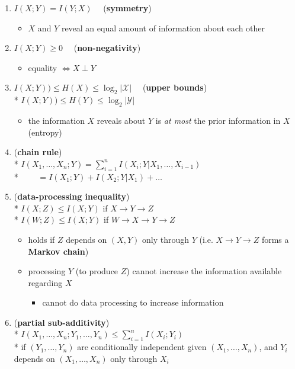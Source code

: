 \documentclass[10pt, landscape]{article}
\begin{document}
\begin{multicols*}{4}
  \begin{enumerate}
    \item $I(X; Y) = I(Y;X) \quad$ (\textbf{symmetry})
      \begin{itemize}
        \item $X$ and $Y$ reveal an equal amount of information about each other
      \end{itemize}
    \item $I(X;Y) \geq 0 \quad $ (\textbf{non-negativity})
      \begin{itemize}
        \item equality $\iff X \perp Y$
      \end{itemize}
    \item $I(X;Y)) \leq H(X) \leq \log_2 \vert \mathcal{X} \vert \quad$ (\textbf{upper bounds}) 
      \\* $I(X;Y)) \leq H(Y) \leq \log_2 \vert \mathcal{Y} \vert$
      \begin{itemize}
        \item the information $X$ reveals about $Y$ is \textit{at most} the prior information in $X$ (entropy)
      \end{itemize}
    \item (\textbf{chain rule}) 
      \\* \( {\displaystyle{ I(X_1, \dots, X_n;Y) = \sum^n_{i=1} I(X_i; Y \vert X_1, \dots, X_{i-1}) }} \) 
      \\* $ \quad\quad = I(X_1;Y) + I(X_2;Y \vert X_1) + \dots$
    \item (\textbf{data-processing inequality})
      \\* $I(X;Z) \leq I(X;Y)$ if $X \rightarrow Y \rightarrow Z$ $\quad$  
      \\* $I(W;Z) \leq I(X;Y)$ if $W \rightarrow X \rightarrow Y \rightarrow Z$ $\quad$  
      \begin{itemize}
        \item holds if $Z$ depends on $(X, Y)$ only through $Y$ (i.e. $X \rightarrow Y \rightarrow Z$ forms a \textbf{Markov chain})
        \item processing $Y$ (to produce $Z$)  cannot increase the information available regarding $X$
          \begin{itemize}
            \item cannot do data processing to increase information
          \end{itemize}
      \end{itemize}
    \item (\textbf{partial sub-additivity}) 
      \\*  \( {\displaystyle{ I(X_1, \dots, X_n; Y_1, \dots, Y_n) \leq \sum^n_{i=1} I(X_i;Y_i) }} \) 
      \\* if $(Y_1, \dots, Y_n)$ are conditionally independent given $(X_1, \dots, X_n)$, and $Y_i$ depends on $(X_1, \dots, X_n)$ only through $X_i$
  \end{enumerate}



\end{multicols*}
\end{document}
